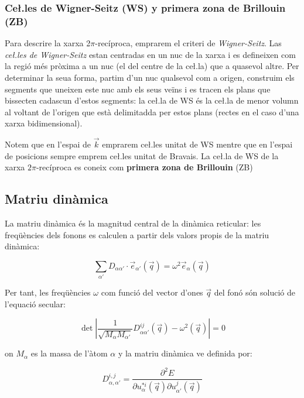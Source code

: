 \documentclass[12pt,twoside,a4paper, notitlepage]{article}%
\begin{document}
\subsubsection{Ce\l.les de Wigner-Seitz (WS) y primera zona de Brillouin (ZB)}
Para descrire la xarxa 2$\pi$-recíproca, emprarem el criteri de \textit{Wigner-Seitz}. Las \textit{ce\l.les de Wigner-Seitz} estan centradas en un nuc de la xarxa i es defineixen com la regió més pròxima a un nuc (el del centre de la ce\l.la) que a quasevol altre. Per determinar la seua forma, partim d'un nuc qualsevol com a origen, construim els segments que uneixen este nuc amb els seus veïns i es tracen els plans que bissecten cadascun d'estos segments: la ce\l.la de WS és la ce\l.la de menor volumn al voltant de l'origen que està delimitadda per estos plans (rectes en el caso d'una xarxa bidimensional).

Notem que en l'espai de $\vec k$ emprarem ce\l.les unitat de WS mentre que en l'espai de posicions sempre emprem ce\l.les unitat de Bravais.
La ce\l.la de WS de la xarxa $2\pi$-recíproca es coneix com \textbf{primera zona de Brillouin} (ZB)

\newpage
\subsection{Matriu dinàmica}

La matriu dinàmica és la magnitud central de la dinàmica reticular: les freqüències dels fonons es calculen a partir dels valors propis de la matriu dinàmica:

\begin{equation}
\sum_{\alpha\prime}D_{\alpha\alpha\prime}\cdot\vec e_{\alpha\prime}(\vec q)=\omega^{2}\vec e_{\alpha}(\vec q)
\end{equation}   

Per tant, les freqüències $\omega$ com funció del vector d'ones $\vec q$ del fonó són solució de l'equació secular:

\begin{equation}
\det\left|\frac{1}{\sqrt{M_\alpha M_{\alpha\prime}}}D^{ij}_{\alpha\alpha\prime}\left(\vec q\right)-\omega^2\left(\vec q\right)\right|=0 
\end{equation}

on $M_{\alpha}$ es la massa de l'àtom $\alpha$ y la matriu dinàmica ve definida por:

\begin{equation}
D_{\alpha,\alpha\prime}^{i,j}=\frac{\partial^2 E}{\partial u_{\alpha}^{*i}(\vec q)\partial u_{\alpha\prime}^{j}(\vec q)}
\label{eq:Matriz_Dinámica}
\end{equation}
\end{document}
